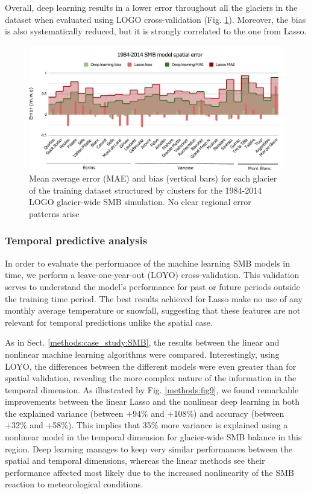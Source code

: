 Overall, deep learning results in a lower error throughout all the glaciers in the dataset when evaluated using LOGO cross-validation (Fig. \ref{methods:fig8}). Moreover, the bias is also systematically reduced, but it is strongly correlated to the one from Lasso. 

\begin{figure}[t]
\centering
\includegraphics[width=16cm]{Figures/methods/Figure_8.pdf}
\caption{Mean average error (MAE) and bias (vertical bars) for each glacier of the training dataset structured by clusters for the 1984-2014 LOGO glacier-wide SMB simulation. No clear regional error patterns arise}
\label{methods:fig8}
\end{figure}

\subsubsection{Temporal predictive analysis}

In order to evaluate the performance of the machine learning SMB models in time, we perform a leave-one-year-out (LOYO) cross-validation. This validation serves to understand the model’s performance for past or future periods outside the training time period. The best results achieved for Lasso make no use of any monthly average temperature or snowfall, suggesting that these features are not relevant for temporal predictions unlike the spatial case.

As in Sect. \ref{methods:case_study:SMB}, the results between the linear and nonlinear machine learning algorithms were compared. Interestingly, using LOYO, the differences between the different models were even greater than for spatial validation, revealing the more complex nature of the information in the temporal dimension. As illustrated by Fig. \ref{methods:fig9}, we found remarkable improvements between the linear Lasso and the nonlinear deep learning in both the explained variance (between +94\% and +108\%) and accuracy (between +32\% and +58\%). This implies that 35\% more variance is explained using a nonlinear model in the temporal dimension for glacier-wide SMB balance in this region. Deep learning manages to keep very similar performances between the spatial and temporal dimensions, whereas the linear methods see their performance affected most likely due to the increased nonlinearity of the SMB reaction to meteorological conditions. 

